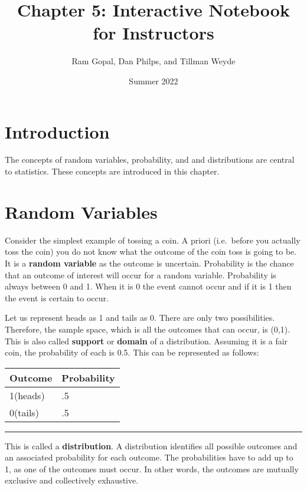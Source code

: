 \documentclass[
]{article}
\title{Chapter 5: Interactive Notebook for Instructors}
\author{Ram Gopal, Dan Philps, and Tillman Weyde}
\date{Summer 2022}
\begin{document}
\maketitle

{
\setcounter{tocdepth}{4}
\tableofcontents
}
\hypertarget{introduction}{%
\section{Introduction}\label{introduction}}

The concepts of random variables, probability, and and distributions are
central to statistics. These concepts are introduced in this chapter.

\hypertarget{random-variables}{%
\section{Random Variables}\label{random-variables}}

Consider the simplest example of tossing a coin. A priori (i.e.~before
you actually toss the coin) you do not know what the outcome of the coin
toss is going to be. It is a \textbf{random variable} as the outcome is
uncertain. Probability is the chance that an outcome of interest will
occur for a random variable. Probability is always between 0 and 1. When
it is 0 the event cannot occur and if it is 1 then the event is certain
to occur.

Let us represent heads as 1 and tails as 0. There are only two
possibilities. Therefore, the sample space, which is all the outcomes
that can occur, is (0,1). This is also called \textbf{support} or
\textbf{domain} of a distribution. Assuming it is a fair coin, the
probability of each is 0.5. This can be represented as follows:

\begin{longtable}[]{@{}ll@{}}
\toprule()
Outcome & Probability \\
\midrule()
\endhead
1(heads) & .5 \\
0(tails) & .5 \\
\bottomrule()
\end{longtable}

\begin{center}\rule{0.5\linewidth}{0.5pt}\end{center}

This is called a \textbf{distribution}. A distribution identifies all
possible outcomes and an associated probability for each outcome. The
probabilities have to add up to 1, as one of the outcomes must occur. In
other words, the outcomes are mutually exclusive and collectively
exhaustive.
\end{document}
